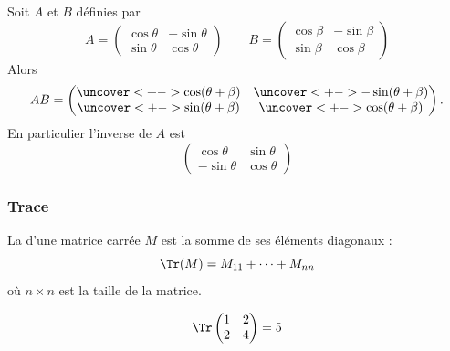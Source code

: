 \begin{frame}
  \begin{example}
    Soit \(A\) et \(B\) définies par
    \begin{equation*}
      A =
      \begin{pmatrix}
        \cos\theta & -\sin\theta \\
        \sin\theta & \cos\theta
      \end{pmatrix}\qquad
      B = \begin{pmatrix}
        \cos\beta & -\sin\beta \\
        \sin\beta & \cos\beta
      \end{pmatrix}
    \end{equation*}\pause{}
    Alors
    \begin{equation*}
      AB = \begin{pmatrix}
        \uncover<+->{\cos(\theta+\beta)} & \uncover<+->{-\sin(\theta+\beta)} \\
        \uncover<+->{\sin(\theta+\beta)} & \uncover<+->{\cos(\theta+\beta)}
      \end{pmatrix}.
    \end{equation*}\pause{}
    En particulier l'inverse de \(A\) est\pause{}
    \begin{equation*}
      \begin{pmatrix}
        \cos\theta & \sin\theta \\
        -\sin\theta & \cos\theta
      \end{pmatrix}
    \end{equation*}
  \end{example}  
\end{frame}

\subsubsection{Trace}
\begin{frame}
  \begin{definition}
    La  d'une matrice carrée \(M\) est la somme de ses éléments diagonaux :
    \begin{equation*}
      \Tr(M) = M_{11} + \cdots + M_{nn}
    \end{equation*}
    où \(n\times n\) est la taille de la matrice.
  \end{definition}\pause{}
  \begin{example}
    \begin{equation*}
      \Tr \begin{pmatrix} 1 & 2 \\ 2 & 4 \end{pmatrix} = 5
    \end{equation*}
  \end{example}
\end{frame}

